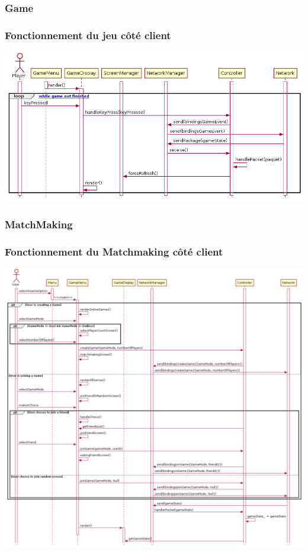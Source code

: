 \documentclass{beamer}
\begin{document}
\subsubsection{Game}
\begin{frame}
\frametitle{Fonctionnement du jeu côté client}

\includegraphics[width=1\textwidth]{../../res/uml/sequence/GameClientSequence.png}
\end{frame}

\subsubsection{MatchMaking}
\begin{frame}
\frametitle{Fonctionnement du Matchmaking côté client}

\includegraphics[width=1\textwidth]{../../res/uml/sequence/MatchMakingClientSequence.png}
\end{frame}
\end{document}
